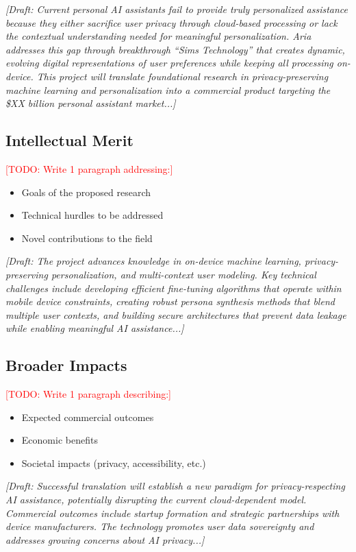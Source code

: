 \documentclass[11pt]{article}
\newcommand{\TODO}[1]{\textcolor{red}{[TODO: #1]}}
\begin{document}
\textit{[Draft: Current personal AI assistants fail to provide truly personalized 
assistance because they either sacrifice user privacy through cloud-based processing 
or lack the contextual understanding needed for meaningful personalization. Aria 
addresses this gap through breakthrough ``Sims Technology'' that creates dynamic, 
evolving digital representations of user preferences while keeping all processing 
on-device. This project will translate foundational research in privacy-preserving 
machine learning and personalization into a commercial product targeting the \$XX 
billion personal assistant market...]}

\subsection*{Intellectual Merit}
\TODO{Write 1 paragraph addressing:}
\begin{itemize}[noitemsep]
    \item Goals of the proposed research
    \item Technical hurdles to be addressed
    \item Novel contributions to the field
\end{itemize}

\textit{[Draft: The project advances knowledge in on-device machine learning, 
privacy-preserving personalization, and multi-context user modeling. Key technical 
challenges include developing efficient fine-tuning algorithms that operate within 
mobile device constraints, creating robust persona synthesis methods that blend 
multiple user contexts, and building secure architectures that prevent data 
leakage while enabling meaningful AI assistance...]}

\subsection*{Broader Impacts}
\TODO{Write 1 paragraph describing:}
\begin{itemize}[noitemsep]
    \item Expected commercial outcomes
    \item Economic benefits
    \item Societal impacts (privacy, accessibility, etc.)
\end{itemize}

\textit{[Draft: Successful translation will establish a new paradigm for 
privacy-respecting AI assistance, potentially disrupting the current 
cloud-dependent model. Commercial outcomes include startup formation and 
strategic partnerships with device manufacturers. The technology promotes 
user data sovereignty and addresses growing concerns about AI privacy...]}
\end{document}
